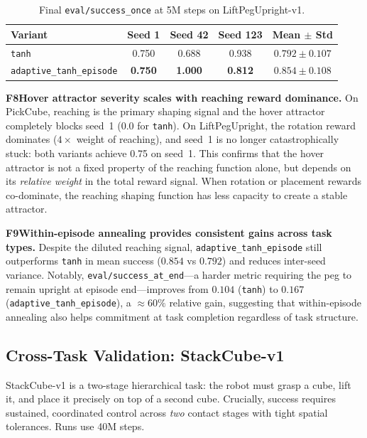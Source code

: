 \documentclass{article}
\newcommand{\finding}[2]{%
  \noindent\textcolor{repcrimson}{\textbf{#1}}\;\textbf{#2.}\enspace}
\begin{document}
\begin{table}[h]
\centering
\small
\caption{Final \texttt{eval/success\_once} at 5M steps on LiftPegUpright-v1.}
\label{tab:liftpeg}
\begin{tabular}{@{}lcccc@{}}
\toprule
\textbf{Variant} & \textbf{Seed 1} & \textbf{Seed 42} & \textbf{Seed 123}
    & \textbf{Mean $\pm$ Std} \\
\midrule
\texttt{tanh}                 & 0.750 & 0.688 & 0.938 & $0.792 \pm 0.107$ \\
\texttt{adaptive\_tanh\_episode} & \textbf{0.750} & \textbf{1.000} & \textbf{0.812}
    & $\mathbf{0.854 \pm 0.108}$ \\
\bottomrule
\end{tabular}
\end{table}

\finding{F8}{Hover attractor severity scales with reaching reward dominance}
On PickCube, reaching is the primary shaping signal and the hover attractor
completely blocks seed~1 ($0.0$ for \texttt{tanh}).
On LiftPegUpright, the rotation reward dominates ($4\times$ weight of reaching),
and seed~1 is no longer catastrophically stuck: both variants achieve 0.75 on
seed~1.
This confirms that the hover attractor is not a fixed property of the reaching
function alone, but depends on its \emph{relative weight} in the total reward
signal. When rotation or placement rewards co-dominate, the reaching shaping
function has less capacity to create a stable attractor.

\finding{F9}{Within-episode annealing provides consistent gains across task types}
Despite the diluted reaching signal, \texttt{adaptive\_tanh\_episode} still
outperforms \texttt{tanh} in mean success ($0.854$ vs $0.792$) and reduces
inter-seed variance. Notably, \texttt{eval/success\_at\_end}---a harder metric
requiring the peg to remain upright at episode end---improves from $0.104$
(\texttt{tanh}) to $0.167$ (\texttt{adaptive\_tanh\_episode}), a $\approx\!60\%$
relative gain, suggesting that within-episode annealing also helps commitment at
task completion regardless of task structure.

\subsection{Cross-Task Validation: StackCube-v1}
\label{sec:stackcube}

StackCube-v1 is a two-stage hierarchical task: the robot must grasp a cube,
lift it, and place it precisely on top of a second cube. Crucially, success
requires sustained, coordinated control across \emph{two} contact stages
with tight spatial tolerances. Runs use 40M steps.
\end{document}

